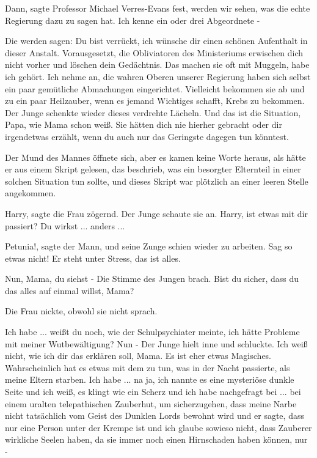 \glqq{}Dann\grqq{}, sagte Professor Michael Verres-Evans fest, \glqq{}werden wir
sehen, was die echte Regierung dazu zu sagen hat. Ich kenne ein oder drei
Abgeordnete -\grqq{}

\glqq{}Die werden sagen: Du bist verrückt, ich wünsche dir einen schönen
Aufenthalt in dieser Anstalt. Vorausgesetzt, die Obliviatoren des Ministeriums
erwischen dich nicht vorher und löschen dein Gedächtnis. Das machen sie oft mit
Muggeln, habe ich gehört. Ich nehme an, die wahren Oberen unserer Regierung
haben sich selbst ein paar gemütliche Abmachungen eingerichtet. Vielleicht
bekommen sie ab und zu ein paar Heilzauber, wenn es jemand Wichtiges schafft,
Krebs zu bekommen.\grqq{} Der Junge schenkte wieder dieses verdrehte Lächeln.
\glqq{}Und das ist die Situation, Papa, wie Mama schon weiß. Sie hätten dich nie
hierher gebracht oder dir irgendetwas erzählt, wenn du auch nur das Geringste
dagegen tun könntest.\grqq{}

Der Mund des Mannes öffnete sich, aber es kamen keine Worte heraus, als hätte er
aus einem Skript gelesen, das beschrieb, was ein besorgter Elternteil in einer
solchen Situation tun sollte, und dieses Skript war plötzlich an einer leeren
Stelle angekommen.

\glqq{}Harry\grqq{}, sagte die Frau zögernd. Der Junge schaute sie an. \glqq{}
Harry, ist etwas mit dir passiert? Du wirkst ... anders ...\grqq{}

\glqq{}Petunia!\grqq{}, sagte der Mann, und seine Zunge schien wieder zu
arbeiten. \glqq{}Sag so etwas nicht! Er steht unter Stress, das ist alles.\grqq{}

\glqq{}Nun, Mama, du siehst -\grqq{} Die Stimme des Jungen brach. \glqq{}Bist du
sicher, dass du das alles auf einmal willst, Mama?\grqq{}

Die Frau nickte, obwohl sie nicht sprach.

\glqq{}Ich habe ... weißt du noch, wie der Schulpsychiater meinte, ich hätte
Probleme mit meiner Wutbewältigung? Nun -\grqq{} Der Junge hielt inne und
schluckte. \glqq{}Ich weiß nicht, wie ich dir das erklären soll, Mama. Es ist eher
etwas Magisches. Wahrscheinlich hat es etwas mit dem zu tun, was in der Nacht
passierte, als meine Eltern starben. Ich habe ... na ja, ich nannte es eine
mysteriöse dunkle Seite und ich weiß, es klingt wie ein Scherz und ich habe
nachgefragt bei ... bei einem uralten telepathischen Zauberhut, um sicherzugehen,
dass meine Narbe nicht tatsächlich vom Geist des Dunklen Lords bewohnt wird und
er sagte, dass nur eine Person unter der Krempe ist und ich glaube sowieso
nicht, dass Zauberer wirkliche Seelen haben, da sie immer noch einen Hirnschaden
haben können, nur -\grqq{}

